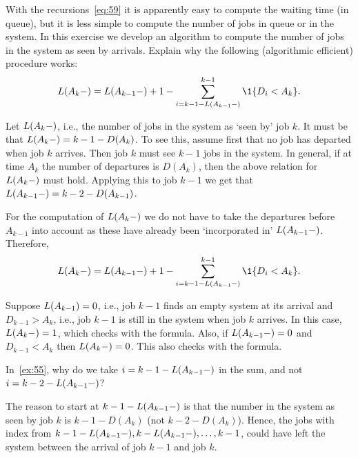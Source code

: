 \begin{exercise}\label{ex:55} 
  With the recursions~\cref{eq:59} it is apparently easy to compute the waiting time (in queue), but it is less simple to compute the number of jobs in queue or in the system.
  In this exercise we develop an algorithm to compute the number of jobs in the system as seen by arrivals.  Explain why the following (algorithmic efficient) procedure works: 
 \begin{equation*}
 \L(A_k-) = \L(A_{k-1}-)+1 - \sum_{i= k-1 - \L(A_{k-1}-)}^{k-1} \1{D_i< A_k}.
 \end{equation*}
\begin{solution}
 Let $ L(A_{k}-)$, i.e., the number of jobs in the system as
 `seen by' job $k$. It must be that $L(A_{k}-)=k-1 - D(A_{k})$. To see
 this, assume first that no job has departed when job $k$
 arrives. Then job $k$ must see $k-1$ jobs in the system. In general,
 if at time $A_k$ the number of departures is $D(A_k)$, then the
 above relation for $L(A_k-)$ must hold. Applying this to job $k-1$ we get that $L(A_{k-1}-) = k-2 - D(A_{k-1})$. 

 For the computation of $L(A_k-)$ we do not have to take the departures
 before $A_{k-1}$ into account as these have already been
 `incorporated in' $L(A_{k-1}-)$. Therefore,
 \begin{equation*}
 \L(A_k-) = \L(A_{k-1}-) + 1 - \sum_{i= k-1 - \L(A_{k-1}-)}^{k-1} \1{D_i< A_k}.
 \end{equation*}

 Suppose $L(A_{k-1})=0$, i.e., job $k-1$ finds an empty system at its
 arrival and $D_{k-1}>A_{k}$, i.e., job $k-1$ is still in the
 system when job $k$ arrives. In this case, $L(A_{k}-)=1$, which checks
 with the formula. Also, if $L(A_{k-1}-)=0$ and $D_{k-1}< A_k$ then
 $L(A_k-) = 0$. This also checks with the formula. 

\end{solution}
\end{exercise}


\begin{exercise}
 In~\cref{ex:55}, why do we take $i=k-1-L(A_{k-1}-)$ in the sum, and not $i=k-2-L(A_{k-1}-)$?
\begin{solution}
 The reason to start at $k-1-L(A_{k-1}-)$ is that the number in the
 system as seen by job $k$ is $k-1 - D(A_k)$ (not
 $k-2-D(A_k)$). Hence, the jobs with index from
 $k-1-L(A_{k-1}-), k-L(A_{k-1}-), \ldots, k-1$, could have left the system
 between the arrival of job $k-1$ and job $k$.
\end{solution}
\end{exercise}






